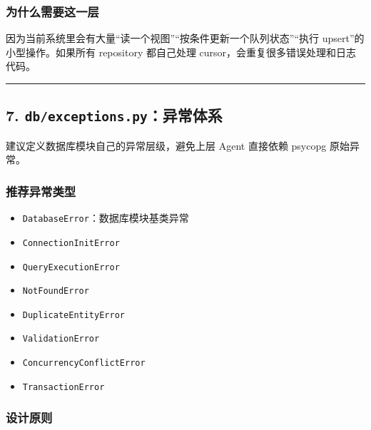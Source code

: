 \documentclass[UTF8]{ctexart}
\providecommand{\tightlist}{%
  \setlength{\itemsep}{0pt}\setlength{\parskip}{0pt}}
\begin{document}
\hypertarget{ux4e3aux4ec0ux4e48ux9700ux8981ux8fd9ux4e00ux5c42}{%
\subsubsection{为什么需要这一层}\label{ux4e3aux4ec0ux4e48ux9700ux8981ux8fd9ux4e00ux5c42}}

因为当前系统里会有大量``读一个视图''``按条件更新一个队列状态''``执行
upsert''的小型操作。如果所有 repository 都自己处理
cursor，会重复很多错误处理和日志代码。

\begin{center}\rule{0.5\linewidth}{0.5pt}\end{center}

\hypertarget{dbexceptions.pyux5f02ux5e38ux4f53ux7cfb}{%
\subsection{\texorpdfstring{7.
\texttt{db/exceptions.py}：异常体系}{7. db/exceptions.py：异常体系}}\label{dbexceptions.pyux5f02ux5e38ux4f53ux7cfb}}

建议定义数据库模块自己的异常层级，避免上层 Agent 直接依赖 psycopg
原始异常。

\hypertarget{ux63a8ux8350ux5f02ux5e38ux7c7bux578b}{%
\subsubsection{推荐异常类型}\label{ux63a8ux8350ux5f02ux5e38ux7c7bux578b}}

\begin{itemize}
\tightlist
\item
  \texttt{DatabaseError}：数据库模块基类异常
\item
  \texttt{ConnectionInitError}
\item
  \texttt{QueryExecutionError}
\item
  \texttt{NotFoundError}
\item
  \texttt{DuplicateEntityError}
\item
  \texttt{ValidationError}
\item
  \texttt{ConcurrencyConflictError}
\item
  \texttt{TransactionError}
\end{itemize}

\hypertarget{ux8bbeux8ba1ux539fux5219-1}{%
\subsubsection{设计原则}\label{ux8bbeux8ba1ux539fux5219-1}}
\end{document}
